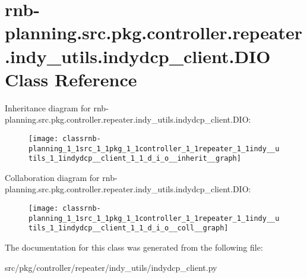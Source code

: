 \hypertarget{classrnb-planning_1_1src_1_1pkg_1_1controller_1_1repeater_1_1indy__utils_1_1indydcp__client_1_1_d_i_o}{}\section{rnb-\/planning.src.\+pkg.\+controller.\+repeater.\+indy\+\_\+utils.\+indydcp\+\_\+client.\+D\+IO Class Reference}
\label{classrnb-planning_1_1src_1_1pkg_1_1controller_1_1repeater_1_1indy__utils_1_1indydcp__client_1_1_d_i_o}


Inheritance diagram for rnb-\/planning.src.\+pkg.\+controller.\+repeater.\+indy\+\_\+utils.\+indydcp\+\_\+client.\+D\+IO\+:
\nopagebreak
\begin{figure}[H]
\begin{center}
\leavevmode
\texttt{[image: classrnb-planning\_1\_1src\_1\_1pkg\_1\_1controller\_1\_1repeater\_1\_1indy\_\_utils\_1\_1indydcp\_\_client\_1\_1\_d\_i\_o\_\_inherit\_\_graph]}
\end{center}
\end{figure}


Collaboration diagram for rnb-\/planning.src.\+pkg.\+controller.\+repeater.\+indy\+\_\+utils.\+indydcp\+\_\+client.\+D\+IO\+:
\nopagebreak
\begin{figure}[H]
\begin{center}
\leavevmode
\texttt{[image: classrnb-planning\_1\_1src\_1\_1pkg\_1\_1controller\_1\_1repeater\_1\_1indy\_\_utils\_1\_1indydcp\_\_client\_1\_1\_d\_i\_o\_\_coll\_\_graph]}
\end{center}
\end{figure}


The documentation for this class was generated from the following file\+:\begin{DoxyCompactItemize}
\item 
src/pkg/controller/repeater/indy\+\_\+utils/indydcp\+\_\+client.\+py\end{DoxyCompactItemize}
